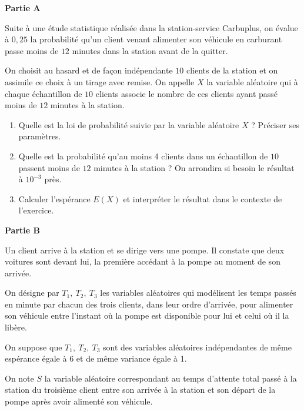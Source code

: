 \medskip

\begin{center}\textbf{Partie A } \end{center}

Suite à une étude statistique réalisée dans la station-service Carbuplus, on évalue à $0,25$ la probabilité qu'un client venant alimenter son véhicule en carburant passe moins de $12$ minutes dans la station avant de la quitter.

On choisit au hasard et de façon indépendante $10$ clients de la station et on assimile ce choix à un tirage avec remise. On appelle $X$ la variable aléatoire qui à chaque échantillon de $10$ clients associe le nombre de ces clients ayant passé moins de $12$ minutes à la station.

\medskip

\begin{enumerate}
\item Quelle est la loi de probabilité suivie par la variable aléatoire $X$ ? Préciser ses paramètres.
\item Quelle est la probabilité qu'au moins 4 clients dans un échantillon de $10$ passent moins
de $12$ minutes à la station ? On arrondira si besoin le résultat à $10^{-3}$ près.
\item Calculer l'espérance $E(X)$ et interpréter le résultat dans le contexte de l'exercice.
\end{enumerate}

\begin{center}\textbf{Partie B } \end{center}

Un client arrive à la station et se dirige vers une pompe. Il constate que deux voitures sont
devant lui, la première accédant à la pompe au moment de son arrivée.

On désigne par $T_1,\: T_2,\: T_3$ les variables aléatoires qui modélisent les temps passés en minute par chacun des trois clients, dans leur ordre d'arrivée, pour alimenter son véhicule entre l'instant où la pompe est disponible pour lui et celui où il la libère.

On suppose que $T_1,\: T_2,\: T_3$ sont des variables aléatoires indépendantes de même espérance égale à $6$ et de même variance égale à 1.

On note $S$ la variable aléatoire correspondant au temps d'attente total passé à la station du troisième client entre son arrivée à la station et son départ de la pompe après avoir alimenté son véhicule.

